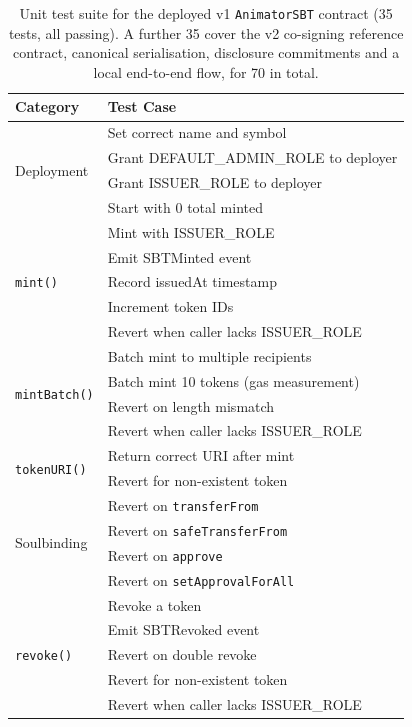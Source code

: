 \begin{table}[ht]
\centering
\caption{Unit test suite for the deployed v1 \texttt{AnimatorSBT} contract
(35 tests, all passing). A further 35 cover the v2 co-signing reference contract,
canonical serialisation, disclosure commitments and a local end-to-end flow,
for 70 in total.}
\label{tab:test_results}
\footnotesize
\setlength{\tabcolsep}{2pt}
\begin{tabular}{@{}ll@{}}
\toprule
\textbf{Category} & \textbf{Test Case} \\
\midrule
\multirow{4}{*}{Deployment}
  & Set correct name and symbol \\
  & Grant DEFAULT\_ADMIN\_ROLE to deployer \\
  & Grant ISSUER\_ROLE to deployer \\
  & Start with 0 total minted \\
\midrule
\multirow{5}{*}{\texttt{mint()}}
  & Mint with ISSUER\_ROLE \\
  & Emit SBTMinted event \\
  & Record issuedAt timestamp \\
  & Increment token IDs \\
  & Revert when caller lacks ISSUER\_ROLE \\
\midrule
\multirow{4}{*}{\texttt{mintBatch()}}
  & Batch mint to multiple recipients \\
  & Batch mint 10 tokens (gas measurement) \\
  & Revert on length mismatch \\
  & Revert when caller lacks ISSUER\_ROLE \\
\midrule
\multirow{2}{*}{\texttt{tokenURI()}}
  & Return correct URI after mint \\
  & Revert for non-existent token \\
\midrule
\multirow{4}{*}{Soulbinding}
  & Revert on \texttt{transferFrom} \\
  & Revert on \texttt{safeTransferFrom} \\
  & Revert on \texttt{approve} \\
  & Revert on \texttt{setApprovalForAll} \\
\midrule
\multirow{5}{*}{\texttt{revoke()}}
  & Revoke a token \\
  & Emit SBTRevoked event \\
  & Revert on double revoke \\
  & Revert for non-existent token \\
  & Revert when caller lacks ISSUER\_ROLE \\

\end{tabular}
\end{table}

